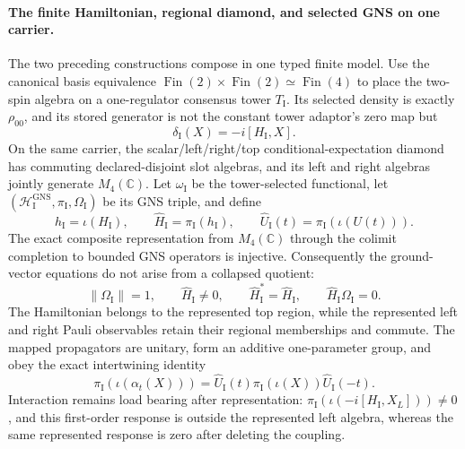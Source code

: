 \documentclass[11pt]{article}
\theoremstyle{remark}
\theoremstyle{plain}
\begin{document}
\paragraph{The finite Hamiltonian, regional diamond, and selected GNS on one
carrier.}
The two preceding constructions compose in one typed finite model.  Use
the canonical basis equivalence
\(\operatorname{Fin}(2)\times\operatorname{Fin}(2)\simeq
\operatorname{Fin}(4)\) to place the two-spin algebra on a one-regulator
consensus tower \(T_{\mathrm I}\).  Its selected density is exactly
\(\rho_{00}\), and its stored generator is not the constant tower adaptor's
zero map but
\[
  \delta_{\mathrm I}(X)=-i[H_{\mathrm I},X].
\]
On the same carrier, the scalar/left/right/top conditional-expectation
diamond has commuting declared-disjoint slot algebras, and its left and right
algebras jointly generate \(M_4(\mathbb C)\).  Let \(\omega_{\mathrm I}\) be
the tower-selected functional, let
\((\mathcal H_{\mathrm I}^{\mathrm{GNS}},\pi_{\mathrm I},
\Omega_{\mathrm I})\) be its GNS triple, and define
\[
 h_{\mathrm I}=\iota(H_{\mathrm I}),\qquad
 \widehat H_{\mathrm I}=\pi_{\mathrm I}(h_{\mathrm I}),\qquad
 \widehat U_{\mathrm I}(t)=
   \pi_{\mathrm I}\!\left(\iota(U(t))\right).
\]
The exact composite representation from \(M_4(\mathbb C)\) through the
colimit completion to bounded GNS operators is injective.  Consequently the
ground-vector equations do not arise from a collapsed quotient:
\[
 \|\Omega_{\mathrm I}\|=1,
 \qquad \widehat H_{\mathrm I}\ne0,
 \qquad \widehat H_{\mathrm I}^{*}=\widehat H_{\mathrm I},
 \qquad \widehat H_{\mathrm I}\Omega_{\mathrm I}=0.
\]
The Hamiltonian belongs to the represented top region, while the represented
left and right Pauli observables retain their regional memberships and
commute.  The mapped propagators are unitary, form an additive one-parameter
group, and obey the exact intertwining identity
\[
 \pi_{\mathrm I}\!\left(\iota(\alpha_t(X))\right)
 =\widehat U_{\mathrm I}(t)
   \pi_{\mathrm I}\!\left(\iota(X)\right)
   \widehat U_{\mathrm I}(-t).
\]
Interaction remains load bearing after representation:
\(\pi_{\mathrm I}(\iota(-i[H_{\mathrm I},X_L]))\ne0\), and this
first-order response is outside the represented left algebra, whereas the
same represented response is zero after deleting the coupling.
\end{document}
